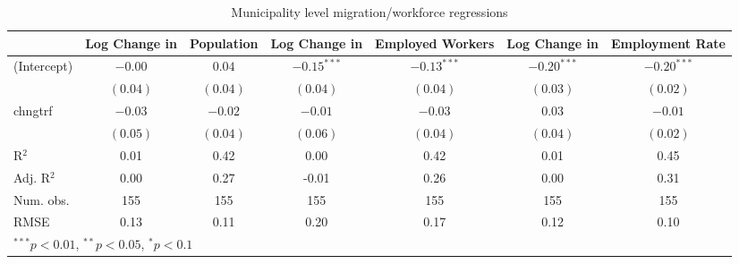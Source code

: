 
\begin{table}
\caption{Municipality level migration/workforce regressions}
\begin{center}
\begin{tabular}{l c c c c c c }
\hline
 & Log Change in & Population & Log Change in & Employed Workers & Log Change in & Employment Rate \\
\hline
(Intercept) & $-0.00$  & $0.04$   & $-0.15^{***}$ & $-0.13^{***}$ & $-0.20^{***}$ & $-0.20^{***}$ \\
            & $(0.04)$ & $(0.04)$ & $(0.04)$      & $(0.04)$      & $(0.03)$      & $(0.02)$      \\
chngtrf     & $-0.03$  & $-0.02$  & $-0.01$       & $-0.03$       & $0.03$        & $-0.01$       \\
            & $(0.05)$ & $(0.04)$ & $(0.06)$      & $(0.04)$      & $(0.04)$      & $(0.02)$      \\
\hline
R$^2$       & 0.01     & 0.42     & 0.00          & 0.42          & 0.01          & 0.45          \\
Adj. R$^2$  & 0.00     & 0.27     & -0.01         & 0.26          & 0.00          & 0.31          \\
Num. obs.   & 155      & 155      & 155           & 155           & 155           & 155           \\
RMSE        & 0.13     & 0.11     & 0.20          & 0.17          & 0.12          & 0.10          \\
\hline
\multicolumn{7}{l}{\scriptsize{$^{***}p<0.01$, $^{**}p<0.05$, $^*p<0.1$}}
\end{tabular}
\label{table:coefficients}
\end{center}
\end{table}

